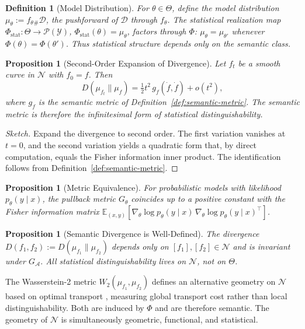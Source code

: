 \documentclass[twocolumn,10pt]{article}
\theoremstyle{thmstyle}
\newtheorem{proposition}[theorem]{Proposition}
\theoremstyle{defstyle}
\newtheorem{definition}[theorem]{Definition}
\begin{document}
\begin{definition}[Model Distribution]
For $\theta \in \Theta$, define the \emph{model distribution}
$\mu_\theta := f_\theta{}_\#\mathcal{D}$, the pushforward of
$\mathcal{D}$ through $f_\theta$. The \emph{statistical realization map}
$\Phi_{\mathrm{stat}} : \Theta \to \mathcal{P}(\mathcal{Y})$,
$\Phi_{\mathrm{stat}}(\theta) = \mu_\theta$, factors through $\Phi$:
$\mu_\theta = \mu_{\theta'}$ whenever $\Phi(\theta) = \Phi(\theta')$.
Thus statistical structure depends only on the semantic class.
\end{definition}

\begin{proposition}[Second-Order Expansion of Divergence]
\label{prop:second-order}
Let $f_t$ be a smooth curve in $\mathcal{N}$ with $f_0 = f$. Then
\[
D(\mu_{f_t} \| \mu_f)
= \tfrac{1}{2} t^2\, g_f(\dot f,\dot f) + o(t^2),
\]
where $g_f$ is the semantic metric of Definition~\ref{def:semantic-metric}.
The semantic metric is therefore the infinitesimal form of statistical
distinguishability.
\end{proposition}

\begin{proof}[Sketch]
Expand the divergence to second order. The first variation vanishes at
$t = 0$, and the second variation yields a quadratic form that, by
direct computation, equals the Fisher information inner product. The
identification follows from Definition~\ref{def:semantic-metric}.
\end{proof}

\begin{proposition}[Metric Equivalence]
For probabilistic models with likelihood $p_\theta(y \mid x)$, the
pullback metric $G_\theta$ coincides up to a positive constant with the
Fisher information matrix
$\mathbb{E}_{(x,y)}[\nabla_\theta\log p_\theta(y\mid x)\,
\nabla_\theta\log p_\theta(y\mid x)^\top]$.
\end{proposition}

\begin{proposition}[Semantic Divergence is Well-Defined]
The divergence $D(f_1,f_2) := D(\mu_{f_1}\|\mu_{f_2})$ depends only on
$[f_1],[f_2] \in \mathcal{N}$ and is invariant under $G_\mathcal{A}$.
All statistical distinguishability lives on $\mathcal{N}$, not on
$\Theta$.
\end{proposition}

The Wasserstein-2 metric $W_2(\mu_{f_1},\mu_{f_2})$ defines an
alternative geometry on $\mathcal{N}$ based on optimal transport
\citep{villani2009optimal}, measuring global transport cost rather than
local distinguishability. Both are induced by $\Phi$ and are therefore
semantic. The geometry of $\mathcal{N}$ is simultaneously geometric,
functional, and statistical.
\end{document}
